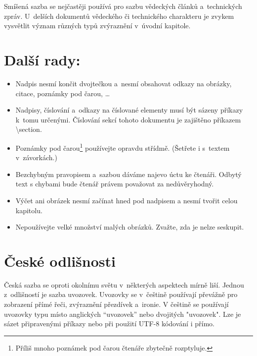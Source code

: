 \documentclass[10pt, a4paper, twocolumn]{article}
\begin{document}
Smíšená sazba se nejčastěji používá pro sazbu vědeckých článků a~technických zpráv. U~delších dokumentů
vědeckého či technického charakteru je zvykem vysvětlit
význam různých typů zvýraznění v~úvodní kapitole.


\section{Další rady:}
\label{rady}

\begin{itemize}
    \item Nadpis nesmí končit dvojtečkou a~nesmí obsahovat
odkazy na obrázky, citace, poznámky pod čarou, \dots
    
    \item Nadpisy, číslování a~odkazy na číslované elementy
musí být sázeny příkazy k~tomu určenými. Číslování sekcí tohoto dokumentu je zajištěno příkazem {\selectfont \textbackslash section}.
    
    \item Poznámky pod čarou\footnote{Příliš mnoho poznámek pod čarou čtenáře zbytečně rozptyluje.} používejte opravdu střídmě.
(Šetřete i s~textem v~závorkách.)
    
    \item Bezchybným pravopisem a~sazbou dáváme najevo
úctu ke čtenáři. Odbytý text s chybami bude čtenář
právem považovat za nedůvěryhodný.
    
    \item Výčet ani obrázek nesmí začínat hned pod nadpisem
a nesmí tvořit celou kapitolu.
    
    \item Nepoužívejte velké množství malých obrázků. Zvažte,
zda je nelze seskupit.

\end{itemize}


\section{České odlišnosti}

Česká sazba se oproti okolnímu světu v~některých aspektech mírně liší. Jednou z~odlišností je sazba uvozovek. Uvozovky se v~češtině používají převážně pro zobrazení přímé
řeči, zvýraznění přezdívek a~ironie. V češtině se používají
uvozovky typu  místo anglických ``uvozovek'' nebo dvojitých "uvozovek". Lze je sázet připravenými příkazy nebo při použití UTF-8 kódování i přímo.
\end{document}
